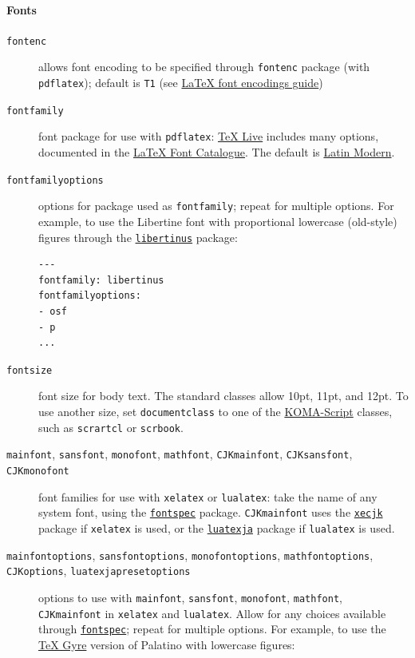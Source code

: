 \documentclass[
]{article}
\begin{document}
\hypertarget{fonts}{%
\paragraph{Fonts}\label{fonts}}

\begin{description}
\item[\texttt{fontenc}]
allows font encoding to be specified through \texttt{fontenc} package
(with \texttt{pdflatex}); default is \texttt{T1} (see
\href{https://ctan.org/pkg/encguide}{LaTeX font encodings guide})
\item[\texttt{fontfamily}]
font package for use with \texttt{pdflatex}:
\href{https://www.tug.org/texlive/}{TeX Live} includes many options,
documented in the \href{https://tug.org/FontCatalogue/}{LaTeX Font
Catalogue}. The default is \href{https://ctan.org/pkg/lm}{Latin Modern}.
\item[\texttt{fontfamilyoptions}]
options for package used as \texttt{fontfamily}; repeat for multiple
options. For example, to use the Libertine font with proportional
lowercase (old-style) figures through the
\href{https://ctan.org/pkg/libertinus}{\texttt{libertinus}} package:

\begin{verbatim}
---
fontfamily: libertinus
fontfamilyoptions:
- osf
- p
...
\end{verbatim}
\item[\texttt{fontsize}]
font size for body text. The standard classes allow 10pt, 11pt, and
12pt. To use another size, set \texttt{documentclass} to one of the
\href{https://ctan.org/pkg/koma-script}{KOMA-Script} classes, such as
\texttt{scrartcl} or \texttt{scrbook}.
\item[\texttt{mainfont}, \texttt{sansfont}, \texttt{monofont},
\texttt{mathfont}, \texttt{CJKmainfont}, \texttt{CJKsansfont},
\texttt{CJKmonofont}]
font families for use with \texttt{xelatex} or \texttt{lualatex}: take
the name of any system font, using the
\href{https://ctan.org/pkg/fontspec}{\texttt{fontspec}} package.
\texttt{CJKmainfont} uses the
\href{https://ctan.org/pkg/xecjk}{\texttt{xecjk}} package if
\texttt{xelatex} is used, or the
\href{https://ctan.org/pkg/luatexja}{\texttt{luatexja}} package if
\texttt{lualatex} is used.
\item[\texttt{mainfontoptions}, \texttt{sansfontoptions},
\texttt{monofontoptions}, \texttt{mathfontoptions}, \texttt{CJKoptions},
\texttt{luatexjapresetoptions}]
options to use with \texttt{mainfont}, \texttt{sansfont},
\texttt{monofont}, \texttt{mathfont}, \texttt{CJKmainfont} in
\texttt{xelatex} and \texttt{lualatex}. Allow for any choices available
through \href{https://ctan.org/pkg/fontspec}{\texttt{fontspec}}; repeat
for multiple options. For example, to use the
\href{http://www.gust.org.pl/projects/e-foundry/tex-gyre}{TeX Gyre}
version of Palatino with lowercase figures:


\end{description}
\end{document}
